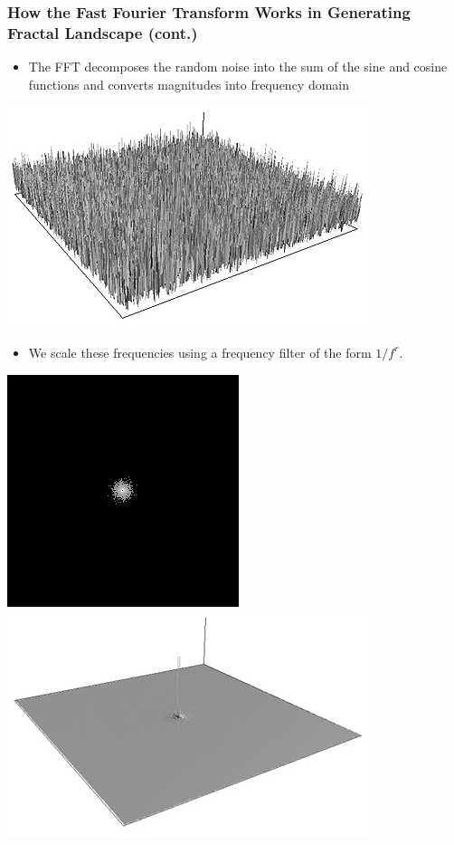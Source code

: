 \documentclass{beamer}
\begin{document}
\begin{frame}
\frametitle{How the Fast Fourier Transform Works in Generating Fractal Landscape (cont.)}
\begin{itemize}
\item The FFT decomposes the random noise into the sum of the sine and cosine functions and converts magnitudes into frequency domain
\end{itemize}
\begin{center}
\includegraphics[scale=0.17]{fft3d.jpg}
\end{center}
\begin{itemize}
\item We scale these frequencies using a frequency filter of the form $1/f^{r}$.
\end{itemize}
\begin{center}
\includegraphics[scale=0.2]{filter2d.jpg}
\includegraphics[scale=0.2]{filter3d.jpg}
\end{center}
\end{frame}
\end{document}
